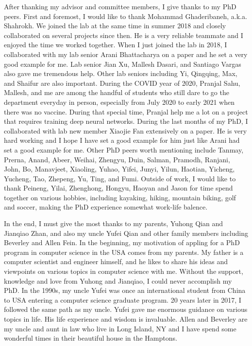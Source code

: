 After thanking my advisor and committee members, I give thanks to my PhD peers. First and foremost, I would like to thank Mohammad Ghaderibaneh, a.k.a. Shahrokh.
We joined the lab at the same time in summer 2018 and closely collaborated on several projects since then. 
He is a very reliable teammate and I enjoyed the time we worked together.
When I just joined the lab in 2018, I collaborated with my lab senior Arani Bhattacharya on a paper and he set a very good example for me. 
Lab senior Jian Xu, Mallesh Dasari, and Santiago Vargas also gave me tremendous help. Other lab seniors including Yi, Qingqing, Max, and Shaifur are also important.
During the COVID year of 2020, Pranjal Sahu, Mallesh, and me are among the handful of students who still dare to go the department everyday in person, 
especially from July 2020 to early 2021 when there was no vaccine.
During that special time, Pranjal help me a lot on a project that requires training deep neural networks.
During the last months of my PhD, I collaborated with lab new member Xiaojie Fan extensively on a paper.
He is very hard working and I hope I have set a good example for him just like Arani had set a good example for me.
Other PhD peers worth mentioning include Tanmay, Prerna, Anand, Abeer, Weihai, Zhengyu, Duin, Salman, Pramodh, Ranjani, John, Bo, Manavjeet, Xiaoling, Yuhao, Yifei, Junyi, Yilun, Haotian, Yicheng, Yucheng, Tao, Zhepeng, Yu, Ting, and Fumi.
Outside of work, I would like to thank Peineng, Yilai, Zhenghong, Hongyu, Haoyan and Jason for time spend together on various hobbies, including kayaking, hiking, mountain biking, golf and soccer, making the PhD experience somewhat work-life balence.

In the end, I must give the most thanks to my parents, Yuhong Qian and Jianqiao Zhan, and also my uncle Yufei Qian 
and other family members including Beverley and Allen Fein.
In the beginning, my motivation of appling for a PhD program in computer science in the USA comes from my parents.
My father is a computer scientist and engineer himself, and he likes to share his ideas and viewpoints on various topics in computer science with me.
Without the support, knowledge and love from Yuhong and Jianqiao, I could never accomplish my PhD.
In the 1990s, my uncle Yufei was once an international student from China to USA entering a computer science graduate program.
20 years later in 2017, I followed the same path as my uncle. 
Yufei gave me enormous guidance on various topics in life. His life experience and wisdom is invaluable.
Allen and Beverley are my uncle and aunt in law who live in Long Island, NY and I have spend some wonderful times in their beautiful house in the Hamptons.

